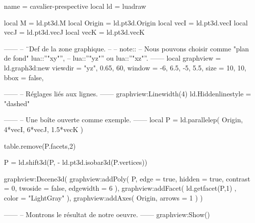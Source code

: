 \documentclass[border = 3pt]{standalone}
\begin{document}
\begin{luadraw*}{name = cavalier-prespective}
local ld = luadraw

local M      = ld.pt3d.M
local Origin = ld.pt3d.Origin
local vecI   = ld.pt3d.vecI
local vecJ   = ld.pt3d.vecJ
local vecK   = ld.pt3d.vecK

------
-- ¨Def de la zone graphique.
--
-- note::
--     Nous pouvons choisir comme "plan de fond" lua::''"xy"'',
--     lua::''"yz"'' ou lua::''"xz"''.
------
local graphview = ld.graph3d:new{
  viewdir = {"yz", 0.65, 60},
  window  = {-6, 6.5, -5, 5.5},
  size    = {10, 10},
  bbox    = false,
}

------
-- Réglages liés aux lignes.
------
graphview:Linewidth(4)
ld.Hiddenlinestyle = "dashed"

------
-- Une boîte ouverte comme exemple.
------
local P = ld.parallelep(
  Origin,
  4*vecI, 6*vecJ, 1.5*vecK
)

table.remove(P.facets,2)

P = ld.shift3d(P, - ld.pt3d.isobar3d(P.vertices))

graphview:Dscene3d(
  graphview:addPoly(
    P,
    {
      edge      = true,
      hidden    = true,
      contrast  = 0,
      twoside   = false,
      edgewidth = 6
    }
  ),
  graphview:addFacet(
    ld.getfacet(P,1) ,
    {
      color = "LightGray"
    }
  ),
  graphview:addAxes(
    Origin,
    {
      arrows = 1
    }
  )
)

------
-- Montrons le résultat de notre oeuvre.
------
graphview:Show()
\end{luadraw*}
\end{document}
